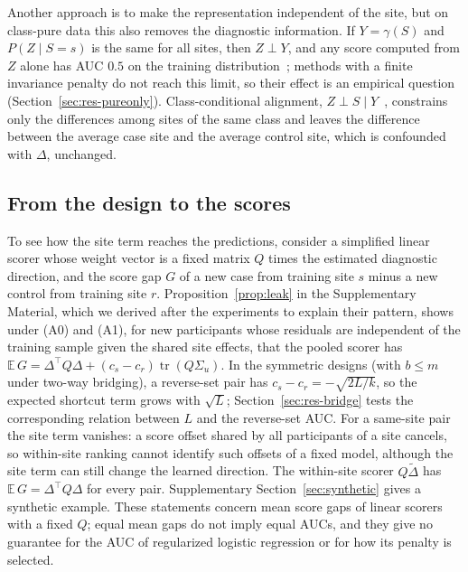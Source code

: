 Another approach is to make the representation independent of the site, but on class-pure data this also removes the diagnostic information. If $Y=\gamma(S)$ and $P(Z\mid S=s)$ is the same for all sites, then $Z\perp Y$, and any score computed from $Z$ alone has AUC $0.5$ on the training distribution~\cite{zhao2019}; methods with a finite invariance penalty do not reach this limit, so their effect is an empirical question (Section~\ref{sec:res-pureonly}). Class-conditional alignment, $Z\perp S\mid Y$~\cite{zhao2020cfnet}, constrains only the differences among sites of the same class and leaves the difference between the average case site and the average control site, which is confounded with $\Delta$, unchanged.

\subsection{From the design to the scores}\label{sec:prop4}

To see how the site term reaches the predictions, consider a simplified linear scorer whose weight vector is a fixed matrix $Q$ times the estimated diagnostic direction, and the score gap $G$ of a new case from training site $s$ minus a new control from training site $r$. Proposition~\ref{prop:leak} in the Supplementary Material, which we derived after the experiments to explain their pattern, shows under (A0) and (A1), for new participants whose residuals are independent of the training sample given the shared site effects, that the pooled scorer has $\mathbb{E}\,G=\Delta^\top Q\Delta+(c_s-c_r)\operatorname{tr}(Q\Sigma_u)$. In the symmetric designs (with $b\le m$ under two-way bridging), a reverse-set pair has $c_s-c_r=-\sqrt{2L/k}$, so the expected shortcut term grows with $\sqrt{L}$; Section~\ref{sec:res-bridge} tests the corresponding relation between $L$ and the reverse-set AUC. For a same-site pair the site term vanishes: a score offset shared by all participants of a site cancels, so within-site ranking cannot identify such offsets of a fixed model, although the site term can still change the learned direction. The within-site scorer $Q\tilde\Delta$ has $\mathbb{E}\,G=\Delta^\top Q\Delta$ for every pair. Supplementary Section~\ref{sec:synthetic} gives a synthetic example. These statements concern mean score gaps of linear scorers with a fixed $Q$; equal mean gaps do not imply equal AUCs, and they give no guarantee for the AUC of regularized logistic regression or for how its penalty is selected.
